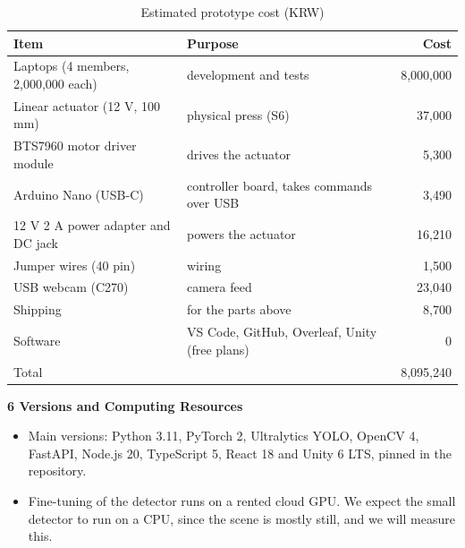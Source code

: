 \documentclass[conference]{IEEEtran}
\begin{document}
\begin{table}[!t]
\caption{Estimated prototype cost (KRW)}
\label{tab:cost}
\centering
\footnotesize
\renewcommand{\arraystretch}{1.1}
\begin{tabular}{p{2.7cm}p{2.9cm}r}
\hline
Item & Purpose & Cost\\
\hline
Laptops (4 members, 2,000,000 each) & development and tests & 8,000,000\\
Linear actuator (12 V, 100 mm) & physical press (S6) & 37,000\\
BTS7960 motor driver module & drives the actuator & 5,300\\
Arduino Nano (USB-C) & controller board, takes commands over USB & 3,490\\
12 V 2 A power adapter and DC jack & powers the actuator & 16,210\\
Jumper wires (40 pin) & wiring & 1,500\\
USB webcam (C270) & camera feed & 23,040\\
Shipping & for the parts above & 8,700\\
Software & VS Code, GitHub, Overleaf, Unity (free plans) & 0\\
\hline
Total & & 8,095,240\\
\hline
\end{tabular}
\end{table}

\par\smallskip\noindent\textbf{6 Versions and Computing Resources}
\begin{itemize}
\item Main versions: Python 3.11, PyTorch 2, Ultralytics YOLO, OpenCV 4, FastAPI, Node.js 20, TypeScript 5, React 18 and Unity 6 LTS, pinned in the repository.
\item Fine-tuning of the detector runs on a rented cloud GPU. We expect the small detector to run on a CPU, since the scene is mostly still, and we will measure this.
\end{itemize}
\end{document}
